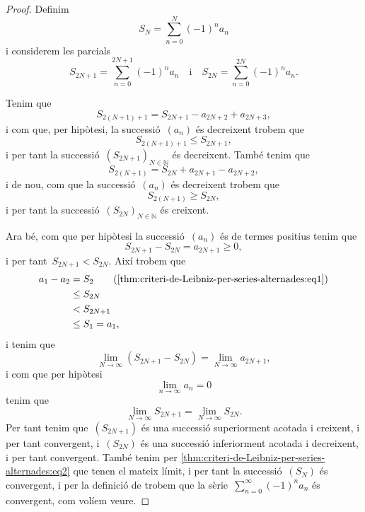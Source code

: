 \documentclass[../../main.tex]{subfiles}
\begin{document}
    \begin{proof}
        Definim
        \begin{equation}
            \label{thm:criteri-de-Leibniz-per-series-alternades:eq1}
            S_{N}=\sum_{n=0}^{N}(-1)^{n}a_{n}
        \end{equation}
        i considerem les parcials
        \[
            S_{2N+1}=\sum_{n=0}^{2N+1}(-1)^{n}a_{n}\quad\text{i}\quad S_{2N}=\sum_{n=0}^{2N}(-1)^{n}a_{n}.
        \]

        Tenim que
        \[
            S_{2(N+1)+1}=S_{2N+1}-a_{2N+2}+a_{2N+3},
        \]
        i com que, per hipòtesi, la successió~\((a_{n})\) és decreixent trobem que
        \[
            S_{2(N+1)+1}\leq S_{2N+1},
        \]
        i per tant la successió~\((S_{2N+1})_{N\in\mathbb{N}}\) és decreixent.
        També tenim que
        \[
            S_{2(N+1)}=S_{2N}+a_{2N+1}-a_{2N+2},
        \]
        i de nou, com que la successió~\((a_{n})\) és decreixent trobem que
        \[
            S_{2(N+1)}\geq S_{2N},
        \]
        i per tant la successió~\((S_{2N})_{N\in\mathbb{N}}\) és creixent.

        Ara bé, com que per hipòtesi la successió~\((a_{n})\) és de termes positius tenim que
        \[
            S_{2N+1}-S_{2N}=a_{2N+1}\geq0,
        \]
        i per tant~\(S_{2N+1}<S_{2N}\).
        Així trobem que
        \begin{align*}
            a_{1}-a_{2}&=S_{2} \tag{\ref{thm:criteri-de-Leibniz-per-series-alternades:eq1}} \\
            &\leq S_{2N} \\
            &< S_{2N+1} \\
            &\leq S_{1}=a_{1},
        \end{align*}
        i tenim que
        \[
            \lim_{N\to\infty}\left(S_{2N+1}-S_{2N}\right)=\lim_{N\to\infty}a_{2N+1},
        \]
        i com que per hipòtesi
        \[
            \lim_{n\to\infty}a_{n}=0
        \]
        tenim que
        \begin{equation}
            \label{thm:criteri-de-Leibniz-per-series-alternades:eq2}
            \lim_{N\to\infty}S_{2N+1}=\lim_{N\to\infty}S_{2N}.
        \end{equation}
        Per tant tenim que~\((S_{2N+1})\) és una successió superiorment acotada i creixent, i per tant convergent, i~\((S_{2N})\) és una successió inferiorment acotada i decreixent, i per tant convergent.
        També tenim per \eqref{thm:criteri-de-Leibniz-per-series-alternades:eq2} que tenen el mateix límit, i per tant la successió~\((S_{N})\) és convergent, i per la definició de  trobem que la sèrie~\(\sum_{n=0}^{\infty}(-1)^{n}a_{n}\) és convergent, com volíem veure.
    \end{proof}
\end{document}
